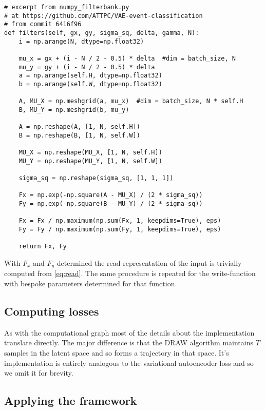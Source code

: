 \begin{minipage}{\linewidth}
\begin{lstlisting}[language=iPython]
# excerpt from numpy_filterbank.py
# at https://github.com/ATTPC/VAE-event-classification
# from commit 6416f96
def filters(self, gx, gy, sigma_sq, delta, gamma, N):
    i = np.arange(N, dtype=np.float32)

    mu_x = gx + (i - N / 2 - 0.5) * delta  #dim = batch_size, N
    mu_y = gy + (i - N / 2 - 0.5) * delta
    a = np.arange(self.H, dtype=np.float32)
    b = np.arange(self.W, dtype=np.float32)

    A, MU_X = np.meshgrid(a, mu_x)  #dim = batch_size, N * self.H
    B, MU_Y = np.meshgrid(b, mu_y)

    A = np.reshape(A, [1, N, self.H])
    B = np.reshape(B, [1, N, self.W])

    MU_X = np.reshape(MU_X, [1, N, self.H])
    MU_Y = np.reshape(MU_Y, [1, N, self.W])

    sigma_sq = np.reshape(sigma_sq, [1, 1, 1])

    Fx = np.exp(-np.square(A - MU_X) / (2 * sigma_sq))
    Fy = np.exp(-np.square(B - MU_Y) / (2 * sigma_sq))

    Fx = Fx / np.maximum(np.sum(Fx, 1, keepdims=True), eps)
    Fy = Fy / np.maximum(np.sum(Fy, 1, keepdims=True), eps)

    return Fx, Fy
\end{lstlisting}
\end{minipage}

With $F_x$ and $F_y$ determined the read-representation of the input is trivially computed from \ref{eq:read}. The same procedure is repeated for the write-function with bespoke parameters determined for that function.

\subsection{Computing losses}

As with the computational graph most of the details about the implementation translate directly. The major difference is that the DRAW algorithm maintains $T$ samples in the latent space and so forms a trajectory in that space. It's implementation is entirely analogous to the variational autoencoder loss and so we omit it for brevity. 

\subsection{Applying the framework}

